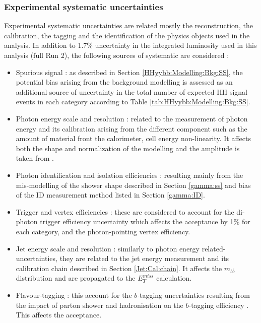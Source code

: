 \subsubsection{Experimental systematic uncertainties}
\label{HHyybb:Syst:Exp}
Experimental systematic uncertainties are related mostly the reconstruction, the calibration, the tagging and the identification of the physics objects used in the analysis. In addition to 1.7\% uncertainty in the integrated luminosity used in this analysis (full Run 2), the following sources of systematic are considered : 
\begin{itemize}
    \item Spurious signal : as described in Section \ref{HHyybb:Modelling:Bkg:SS}, the potential bias arising from the background modelling is assessed as an additional source of uncertainty in the total number of expected HH signal events in each category according to Table \ref{tab:HHyybb:Modelling:Bkg:SS}.
    \item Photon energy scale and resolution : related to the measurement of photon energy and its calibration arising from the different component such as the amount of material front the calorimeter, cell energy non-linearity. It affects both the shape and normalization of the modelling and the amplitude is taken from \cite{PES}.
    \item Photon identification and isolation efficiencies : resulting mainly from the mis-modelling of the shower shape described in Section \ref{gamma:ss} and bias of the ID measurement method listed in Section \ref{gamma:ID}. 
    \item Trigger and vertex efficiencies : these are considered to account for the di-photon trigger efficiency uncertainty which affects the acceptance by 1\% for each category, and the photon-pointing vertex efficiency.
    \item Jet energy scale and resolution : similarly to photon energy related-uncertainties, they are related to the jet energy measurement and its calibration chain described in Section \ref{Jet:Cal:chain}. It affects the $m_{b\bar{b}}$ distribution and are propagated to the $E_{T}^{miss}$ calculation. 
    \item Flavour-tagging : this account for the $b$-tagging uncertainties resulting from the impact of parton shower and hadronisation on the $b$-tagging efficiency \cite{IP2}. This affects the acceptance.
\end{itemize}

